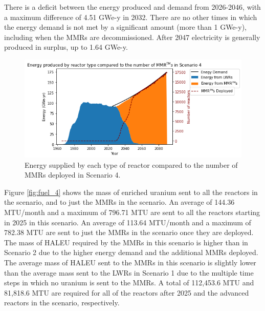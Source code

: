 There is a deficit between the energy produced and  
demand from 2026-2046, with a maximum difference of 4.51 GWe-y in 2032.
There are no other times in which the energy demand is not met by a 
significant amount (more than 1 GWe-y), including when the \glspl{MMR} are 
decommissioned. After 2047 electricity is generally produced in surplus, 
up to 1.64 GWe-y. 

\begin{figure}
    \centering 
    \includegraphics[width=\textwidth]{../figures/energy_scenario4.png}
    \caption{Energy supplied by each type of reactor compared to the number of 
    \glspl{MMR} deployed in Scenario 4.}
    \label{fig:energy_rx_4}
\end{figure}

Figure \ref{fig:fuel_4} shows the mass of enriched uranium sent to all the 
reactors in the scenario, and to just the \glspl{MMR} 
in the scenario. An average of 144.36 MTU/month and a maximum of 796.71 MTU
are sent to all the reactors starting in 2025 in this scenario. An average of 
113.64 MTU/month and a maximum of 782.38 MTU are sent to just the \glspl{MMR}
in the scenario once they are deployed. The mass of \gls{HALEU}
required by the \glspl{MMR} in this scenario is higher than  
in Scenario 2 due to the higher energy 
demand and the additional \glspl{MMR} deployed. The 
average mass of \gls{HALEU} sent to the \glspl{MMR} in this scenario is 
slightly lower than the average mass sent to the \glspl{LWR} in Scenario 1 
due to the multiple time steps in which no uranium is sent to the \glspl{MMR}.
A total of 112,453.6 MTU and 81,818.6 MTU are required for all of the 
reactors after 2025 and the advanced reactors in the scenario, respectively. 

